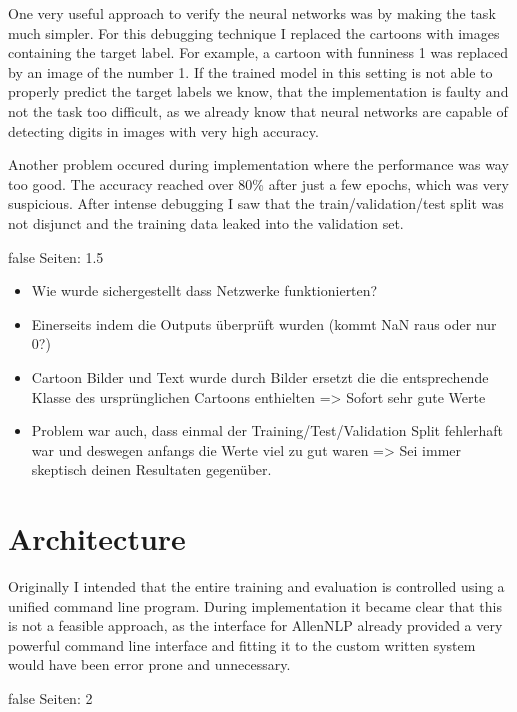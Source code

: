 \documentclass[draft,final,oneside]{vutinfth} %
\begin{document}
One very useful approach to verify the neural networks was by making the task much simpler. For this debugging technique I replaced the cartoons with images containing the target label. For example, a cartoon with funniness 1 was replaced by an image of the number 1. If the trained model in this setting is not able to properly predict the target labels we know, that the implementation is faulty and not the task too difficult, as we already know that neural networks are capable of detecting digits in images with very high accuracy.

Another problem occured during implementation where the performance was way too good. The accuracy reached over 80\% after just a few epochs, which was very suspicious. After intense debugging I saw that the train/validation/test split was not disjunct and the training data leaked into the validation set. 	

\if false
Seiten: 1.5

\begin{itemize}
\item Wie wurde sichergestellt dass Netzwerke funktionierten? 
\item Einerseits indem die Outputs überprüft wurden (kommt NaN raus oder nur 0?)
\item Cartoon Bilder und Text wurde durch Bilder ersetzt die die entsprechende Klasse des ursprünglichen Cartoons enthielten => Sofort sehr gute Werte
\item Problem war auch, dass einmal der Training/Test/Validation Split fehlerhaft war und deswegen anfangs die Werte viel zu gut waren => Sei immer skeptisch deinen Resultaten gegenüber.
\end{itemize}
\fi


\section{Architecture}


Originally I intended that the entire training and evaluation is controlled using a unified command line program. During implementation it became clear that this is not a feasible approach, as the interface for AllenNLP already provided a very powerful command line interface and fitting it to the custom written system would have been error prone and unnecessary.


\if false
Seiten: 2
\end{document}
